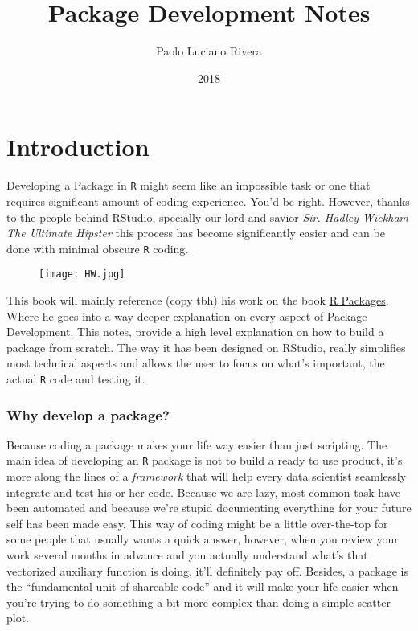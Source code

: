 \documentclass[pdftex,11pt,a4paper]{article}
\title{Package Development Notes}
\author{Paolo Luciano Rivera}
\date{2018}
\newcommand{\R}{\texttt{R} }
\begin{document}
\maketitle

\section*{Introduction}
Developing a Package in \R might seem like an impossible task or one that requires significant amount of coding experience. You'd be right. However, thanks to the people behind \href{https://www.rstudio.com/}{RStudio}, specially our lord and savior \textit{Sir. Hadley Wickham The Ultimate Hipster} this process has become significantly easier and can be done with minimal obscure \R coding. 

\begin{figure}[h]
	\centering
	\texttt{[image: HW.jpg]}
\end{figure}

This book will mainly reference (copy tbh) his work on the book \href{http://r-pkgs.had.co.nz}{R Packages}. Where he goes into a way deeper explanation on every aspect of Package Development. This notes, provide a high level explanation on how to build a package from scratch. The way it has been designed on RStudio, really simplifies most technical aspects and allows the user to focus on what's important, the actual \R code and testing it. 

\subsubsection*{Why develop a package?}
Because coding a package makes your life way easier than just scripting. The main idea of developing an \R package is not to build a ready to use product, it's more along the lines of a \textit{framework} that will help every data scientist seamlessly integrate and test his or her code. Because we are lazy, most common task have been automated and because we're stupid documenting everything for your future self has been made easy. This way of coding might be a little over-the-top for some people that usually wants a quick answer, however, when you review your work several months in advance and you actually understand what's that vectorized auxiliary function is doing, it'll definitely pay off. Besides, a package is the ``fundamental unit of shareable code'' and it will make your life easier when you're trying to do something a bit more complex than doing a simple scatter plot.\\
\end{document}
